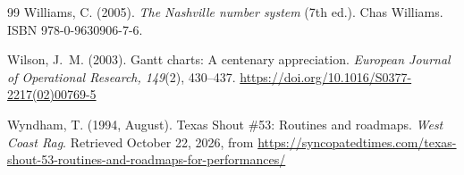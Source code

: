 \documentclass[10pt,twocolumn,a4paper]{article}
\begin{document}
\begin{thebibliography}{99}
Williams, C. (2005). \emph{The Nashville number system} (7th ed.). Chas Williams. ISBN 978-0-9630906-7-6.

Wilson, J.~M. (2003). Gantt charts: A centenary appreciation. \emph{European Journal
of Operational Research, 149}(2), 430--437.
\url{https://doi.org/10.1016/S0377-2217(02)00769-5}

Wyndham, T. (1994, August). Texas Shout \#53: Routines and roadmaps. \emph{West Coast
Rag}. Retrieved October 22, 2026, from
\url{https://syncopatedtimes.com/texas-shout-53-routines-and-roadmaps-for-performances/}

\end{thebibliography}
\end{document}
